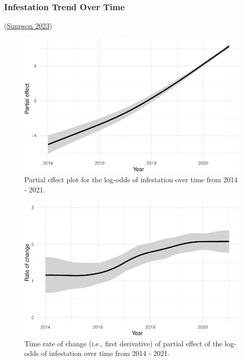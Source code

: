 \documentclass[
  letterpaper,
  DIV=11,
  numbers=noendperiod]{scrartcl}
\begin{document}
\hypertarget{infestation-trend-over-time}{%
\subsubsection{Infestation Trend Over
Time}\label{infestation-trend-over-time}}

(\protect\hyperlink{ref-gratia2023}{Simpson 2023})

\begin{figure}

{\centering \includegraphics{revisions_statistical_analysis_files/figure-pdf/fig-time-1.pdf}

}

\caption{\label{fig-time}Partial effect plot for the log-odds of
infestation over time from 2014 - 2021.}

\end{figure}

\begin{figure}

{\centering \includegraphics{revisions_statistical_analysis_files/figure-pdf/fig-time-deriv-1.pdf}

}

\caption{\label{fig-time-deriv}Time rate of change (i.e., first
derivative) of partial effect of the log-odds of infestation over time
from 2014 - 2021.}

\end{figure}
\end{document}
